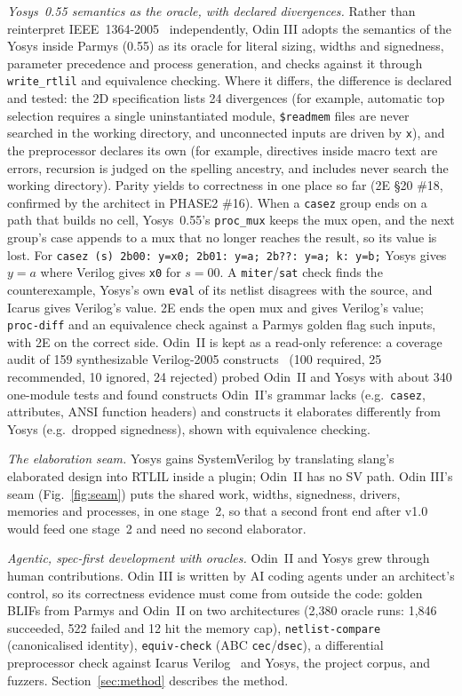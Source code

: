 \documentclass[conference]{IEEEtran}
\newcommand{\code}[1]{\texttt{#1}}
\begin{document}
\emph{Yosys~0.55 semantics as the oracle, with declared divergences.} Rather than reinterpret
IEEE~1364-2005~ independently, Odin III adopts the semantics of the Yosys inside
Parmys (0.55) as its oracle for literal sizing, widths and signedness, parameter precedence and
process generation, and checks against it through \code{write\_rtlil} and equivalence checking.
Where it differs, the difference is declared and tested: the 2D specification lists 24
divergences (for example, automatic top selection requires a single uninstantiated module,
\code{\$readmem} files are never searched in the working directory, and unconnected inputs are
driven by \code{x}), and the preprocessor declares its own (for example, directives inside
macro text are errors, recursion is judged on the spelling ancestry, and includes never search
the working directory). Parity yields to correctness in one place so far (2E \S20 \#18,
confirmed by the architect in PHASE2 \#16). When a \code{casez} group ends on a path that
builds no cell, Yosys~0.55's \code{proc\_mux} keeps the mux open, and the next group's case
appends to a mux that no longer reaches the result, so its value is lost. For
\code{casez (s) 2\textquotesingle b00: y=x0; 2\textquotesingle b01: y=a; 2\textquotesingle b??: y=a; k: y=b;} Yosys gives $y = a$ where
Verilog gives \code{x0} for $s = 00$. A \code{miter}/\code{sat} check finds the
counterexample, Yosys's own \code{eval} of its netlist disagrees with the source, and Icarus
gives Verilog's value. 2E ends the open mux and gives Verilog's value; \code{proc-diff} and an
equivalence check against a Parmys golden flag such inputs, with 2E on the correct side.
Odin~II is kept as a read-only reference: a coverage audit of 159 synthesizable Verilog-2005
constructs~ (100 required, 25 recommended, 10 ignored, 24 rejected) probed
Odin~II and Yosys with about 340 one-module tests and found constructs Odin~II's grammar lacks
(e.g.\ \code{casez}, attributes, ANSI function headers) and constructs it elaborates
differently from Yosys (e.g.\ dropped signedness), shown with equivalence checking.

\emph{The elaboration seam.} Yosys gains SystemVerilog by translating slang's elaborated design
into RTLIL inside a plugin; Odin~II has no SV path. Odin III's seam (Fig.~\ref{fig:seam}) puts
the shared work, widths, signedness, drivers, memories and processes, in one stage~2, so that a
second front end after v1.0 would feed one stage~2 and need no second elaborator.

\emph{Agentic, spec-first development with oracles.} Odin~II and Yosys grew through human
contributions. Odin III is written by AI coding agents under an architect's control, so its
correctness evidence must come from outside the code: golden BLIFs from Parmys and Odin~II on
two architectures (2,380 oracle runs: 1,846 succeeded, 522 failed and 12 hit the memory cap),
\code{netlist-compare} (canonicalised identity), \code{equiv-check} (ABC \code{cec}/\code{dsec}),
a differential preprocessor check against Icarus Verilog~ and Yosys, the project
corpus, and fuzzers. Section~\ref{sec:method} describes the method.
\end{document}

